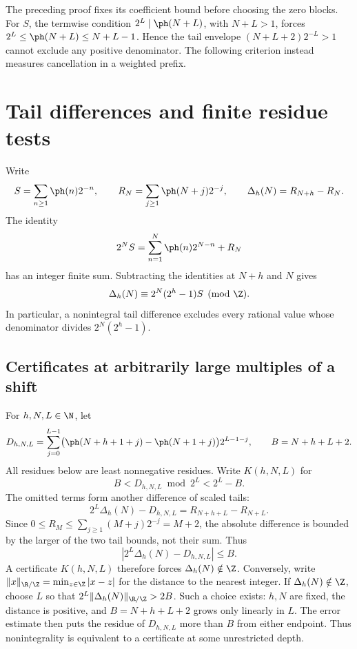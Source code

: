 \documentclass[11pt]{article}
\begin{document}
The preceding proof fixes its coefficient bound before choosing the zero blocks.
For $S$, the termwise condition $2^L\mid\ph(N+L)$, with $N+L>1$, forces
$2^L\le\ph(N+L)\le N+L-1$. Hence the tail envelope
$(N+L+2)2^{-L}>1$ cannot exclude any positive denominator.
The following criterion instead measures cancellation in a weighted prefix.

\section{Tail differences and finite residue tests}\label{sec:carry-rank}
Write
\[
 S=\sum_{n\ge1}\ph(n)2^{-n},\qquad
 R_N=\sum_{j\ge1}\ph(N+j)2^{-j},\qquad
 \Delta_h(N)=R_{N+h}-R_N.
\]
The identity
\[
 2^NS=\sum_{n=1}^N\ph(n)2^{N-n}+R_N
\]
has an integer finite sum. Subtracting the identities at $N+h$ and $N$
gives
\begin{equation}\label{eq:tail-phase}
 \Delta_h(N)\equiv2^N(2^h-1)S\pmod\Z.
\end{equation}
In particular, a nonintegral tail difference excludes every
rational value whose denominator divides $2^N(2^h-1)$.
\subsection{Certificates at arbitrarily large multiples of a shift}
For $h,N,L\in\N$, let
\[
 D_{h,N,L}=\sum_{j=0}^{L-1}
   \bigl(\ph(N+h+1+j)-\ph(N+1+j)\bigr)2^{L-1-j},
 \qquad B=N+h+L+2.
\]
All residues below are least nonnegative residues. Write $K(h,N,L)$ for
\[
 B<D_{h,N,L}\bmod2^L<2^L-B.
\]
The omitted terms form another difference of scaled tails:
\[
 2^L\Delta_h(N)-D_{h,N,L}=R_{N+h+L}-R_{N+L}.
\]
Since $0\le R_M\le\sum_{j\ge1}(M+j)2^{-j}=M+2$, the absolute
difference is bounded by the larger of the two tail bounds, not their sum.
Thus
\begin{equation}\label{eq:tail-error}
 |2^L\Delta_h(N)-D_{h,N,L}|\le B.
\end{equation}
A certificate $K(h,N,L)$ therefore forces $\Delta_h(N)\notin\Z$.
Conversely, write $\|x\|_{\R/\Z}=\min_{z\in\Z}|x-z|$ for the distance to
the nearest integer. If $\Delta_h(N)\notin\Z$, choose $L$ so that
$2^L\|\Delta_h(N)\|_{\R/\Z}>2B$. Such a choice exists: $h,N$ are fixed,
the distance is positive, and $B=N+h+L+2$ grows only linearly in $L$.
The error estimate then puts the residue of $D_{h,N,L}$ more than $B$
from either endpoint. Thus nonintegrality is equivalent to a certificate
at some unrestricted depth.
\end{document}
